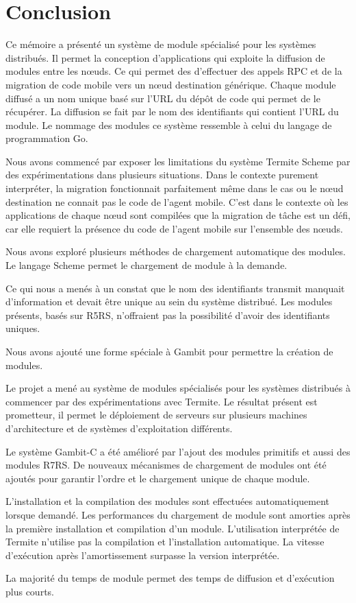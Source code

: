 
\chapter{Conclusion}

Ce mémoire a présenté un système de module spécialisé pour les systèmes
distribués. Il permet la conception d'applications qui exploite la diffusion de
modules entre les nœuds. Ce qui permet des d'effectuer des appels RPC et de la
migration de code mobile vers un nœud destination générique. Chaque module
diffusé a un nom unique basé sur l'URL du dépôt de code qui permet de le
récupérer. La diffusion se fait par le nom des identifiants qui contient l'URL
du module. Le nommage des modules ce système ressemble à celui du langage de
programmation Go.

Nous avons commencé par exposer les limitations du système Termite Scheme par
des expérimentations dans plusieurs situations. Dans le contexte purement
interpréter, la migration fonctionnait parfaitement même dans le cas ou le nœud
destination ne connait pas le code de l'agent mobile.  C'est dans le contexte
où les applications de chaque nœud sont compilées que la migration de tâche
est un défi, car elle requiert la présence du code de l'agent mobile sur l'ensemble
des nœuds.

Nous avons exploré plusieurs méthodes de chargement automatique des modules.
Le langage Scheme permet le chargement de module à la demande.

Ce qui nous a menés à un constat que le nom des identifiants transmit manquait
d'information et devait être unique au sein du système distribué. Les modules
présents, basés sur R5RS, n'offraient pas la possibilité d'avoir des
identifiants uniques.

Nous avons ajouté une forme spéciale à Gambit pour
permettre la création de modules.

Le projet a mené au système de modules spécialisés pour les systèmes distribués
à commencer par des expérimentations avec Termite. Le résultat présent est
prometteur, il permet le déploiement de serveurs sur plusieurs machines
d'architecture et de systèmes d'exploitation différents.

Le système Gambit-C a été amélioré par l'ajout des modules primitifs et aussi
des modules R7RS. De nouveaux mécanismes de chargement de modules ont été
ajoutés pour garantir l'ordre et le chargement unique de chaque module.


L'installation et la compilation des modules sont effectuées automatiquement
lorsque demandé.  Les performances du chargement de module sont amorties après
la première installation et compilation d'un module. L'utilisation interprétée
de Termite n'utilise pas la compilation et l'installation automatique.
La vitesse d'exécution après l'amortissement surpasse la version interprétée.

La majorité du temps de module permet des temps de diffusion et d'exécution
plus courts.





